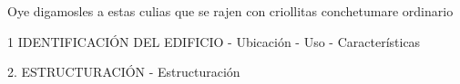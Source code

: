 Oye digamosles a estas culias que se rajen con criollitas
conchetumare ordinario

1 IDENTIFICACIÓN DEL EDIFICIO
- Ubicación
- Uso
- Características

2. ESTRUCTURACIÓN
- Estructuración
